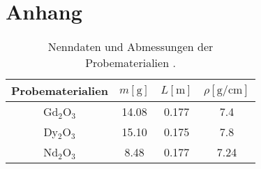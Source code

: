 \section{Anhang}


\begin{table}
    \caption{Nenndaten und Abmessungen der Probematerialien \cite{skript}.}
    \centering
    \label{tab:messspule}
    \begin{tabular}{c || c c c}
        \toprule
        \tiny Probematerialien & $m [\si{\gram}]$ & $L [\si{\meter}]$ & $\rho [\si{\gram\per\centi\meter}] $\\
        \midrule
        Gd$_2$O$_3$ & 14.08 & 0.177 & 7.4 \\
        \midrule
        Dy$_2$O$_3$ & 15.10 & 0.175 & 7.8 \\
        \midrule
        Nd$_2$O$_3$ & 8.48  & 0.177 & 7.24 \\
        \bottomrule    
    \end{tabular}
\end{table}

